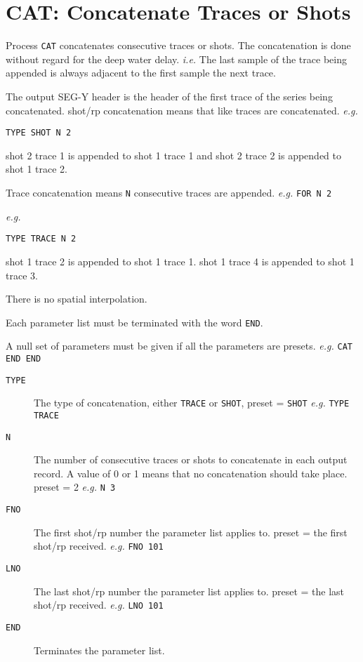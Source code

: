 \section{CAT: Concatenate Traces or Shots}
\label{cmd_cat}

Process \texttt{CAT} concatenates consecutive traces or \glspl{shot}.  The
concatenation is done without regard for the deep water delay.  \textit{i.e.}
The last sample of the trace being appended is always adjacent to the first
sample the next trace.

The output SEG-Y header is the header of the first trace of the series being
concatenated.  \Gls{shot}/\gls{rp} concatenation means that like traces are
concatenated.
\textit{e.g.}
\begin{verbatim}
TYPE SHOT N 2
\end{verbatim}
      shot 2 trace 1 is appended to shot 1 trace 1 and
      shot 2 trace 2 is appended to shot 1 trace 2.

Trace concatenation means \texttt{N} consecutive traces are appended.
\textit{e.g.} \texttt{FOR N 2}

\textit{e.g.}
\begin{verbatim}
TYPE TRACE N 2
\end{verbatim}
shot 1 trace 2 is appended to shot 1 trace 1.
shot 1 trace 4 is appended to shot 1 trace 3.

There is no spatial interpolation.

Each parameter list must be terminated with the word \texttt{END}.

A null set of parameters must be given if all the parameters are
presets. \textit{e.g.} \texttt{CAT END END}

\begin{description}
\item[\texttt{TYPE}] The type of concatenation, either \texttt{TRACE} or \texttt{SHOT}, \Gls{preset} = \texttt{SHOT} \textit{e.g.} \texttt{TYPE TRACE}

\item[\texttt{N}] The number of consecutive traces or \glspl{shot} to concatenate in each output record.  A value of 0 or 1 means that no concatenation should take place. \Gls{preset} = 2            \textit{e.g.} \texttt{N 3}

\item[\texttt{FNO}] The first \gls{shot}/\gls{rp} number the parameter list applies to.  \Gls{preset} = the first \gls{shot}/\gls{rp} received.    \textit{e.g.}   \texttt{FNO 101}

\item[\texttt{LNO}] The last \gls{shot}/\gls{rp} number the parameter list applies to.  \Gls{preset} = the last \gls{shot}/\gls{rp} received.    \textit{e.g.}   \texttt{LNO 101}

\item[\texttt{END}] Terminates the parameter list.
\end{description}


